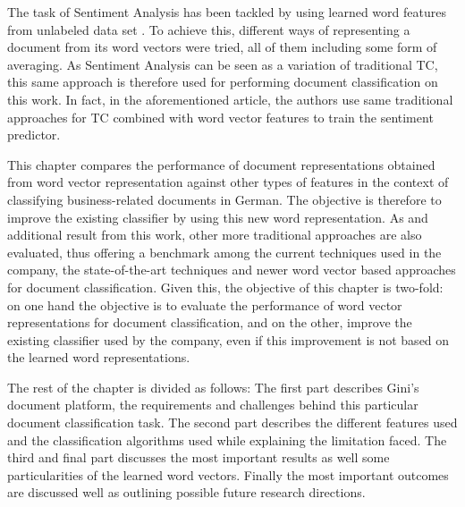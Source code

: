 The task of Sentiment Analysis  has been  tackled by using learned word
features from unlabeled data set \cite{maas2011learning}. To achieve this,
different ways of representing a document from its word vectors were tried,
all of them including some form of averaging. As Sentiment Analysis   can be
seen as a variation of traditional \ac{TC},  this same approach is therefore
used  for performing document classification on this work. In fact, in 
the aforementioned article,  the authors use same  traditional approaches for \ac{TC} combined with word vector features to train the sentiment predictor. 

This chapter compares the performance  of document representations obtained  from  word vector representation against other types of  features  in the context of classifying
business-related documents in German. The objective is therefore to
improve the existing classifier by  using this new word representation.
As and additional result from  this work,  other more traditional
approaches  are also evaluated, thus offering a benchmark among the current
techniques used in the company, the state-of-the-art techniques and 
newer word vector based approaches for document classification. Given this,
the objective of this chapter is two-fold:  on one hand the objective is to evaluate the
performance  of word vector representations for document classification,
and on the other, improve the existing classifier used by the company, even if this improvement is not based on the learned word representations.

The rest of the chapter is divided as follows: The first part describes 
Gini's  document platform, the requirements and challenges behind this
particular document classification task. The second  part describes the different features
used and the classification algorithms used while explaining the limitation
faced. The third and final part discusses the most important results as
well some particularities of the learned word vectors.  Finally the most
important outcomes are discussed well  as outlining possible future
research directions. 

